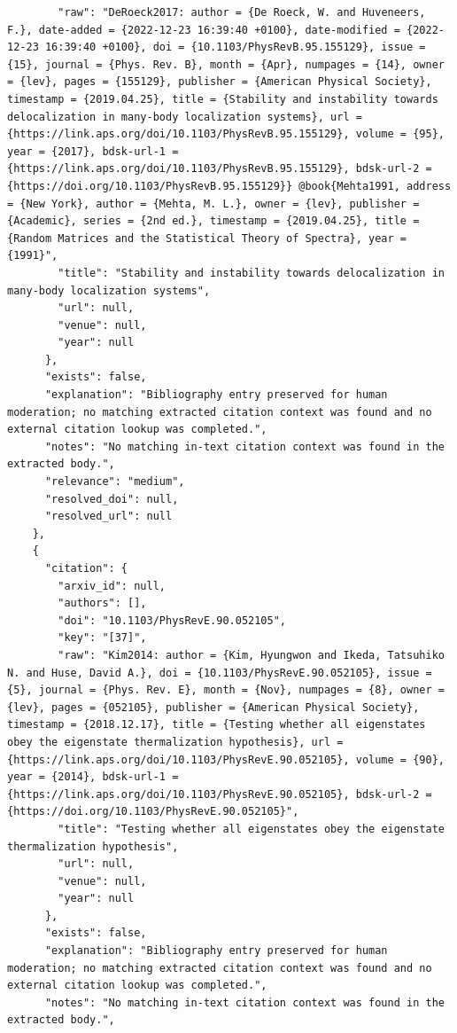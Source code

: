 \documentclass[11pt]{article}
\begin{document}
\begin{verbatim}
        "raw": "DeRoeck2017: author = {De Roeck, W. and Huveneers, F.}, date-added = {2022-12-23 16:39:40 +0100}, date-modified = {2022-12-23 16:39:40 +0100}, doi = {10.1103/PhysRevB.95.155129}, issue = {15}, journal = {Phys. Rev. B}, month = {Apr}, numpages = {14}, owner = {lev}, pages = {155129}, publisher = {American Physical Society}, timestamp = {2019.04.25}, title = {Stability and instability towards delocalization in many-body localization systems}, url = {https://link.aps.org/doi/10.1103/PhysRevB.95.155129}, volume = {95}, year = {2017}, bdsk-url-1 = {https://link.aps.org/doi/10.1103/PhysRevB.95.155129}, bdsk-url-2 = {https://doi.org/10.1103/PhysRevB.95.155129}} @book{Mehta1991, address = {New York}, author = {Mehta, M. L.}, owner = {lev}, publisher = {Academic}, series = {2nd ed.}, timestamp = {2019.04.25}, title = {Random Matrices and the Statistical Theory of Spectra}, year = {1991}",
        "title": "Stability and instability towards delocalization in many-body localization systems",
        "url": null,
        "venue": null,
        "year": null
      },
      "exists": false,
      "explanation": "Bibliography entry preserved for human moderation; no matching extracted citation context was found and no external citation lookup was completed.",
      "notes": "No matching in-text citation context was found in the extracted body.",
      "relevance": "medium",
      "resolved_doi": null,
      "resolved_url": null
    },
    {
      "citation": {
        "arxiv_id": null,
        "authors": [],
        "doi": "10.1103/PhysRevE.90.052105",
        "key": "[37]",
        "raw": "Kim2014: author = {Kim, Hyungwon and Ikeda, Tatsuhiko N. and Huse, David A.}, doi = {10.1103/PhysRevE.90.052105}, issue = {5}, journal = {Phys. Rev. E}, month = {Nov}, numpages = {8}, owner = {lev}, pages = {052105}, publisher = {American Physical Society}, timestamp = {2018.12.17}, title = {Testing whether all eigenstates obey the eigenstate thermalization hypothesis}, url = {https://link.aps.org/doi/10.1103/PhysRevE.90.052105}, volume = {90}, year = {2014}, bdsk-url-1 = {https://link.aps.org/doi/10.1103/PhysRevE.90.052105}, bdsk-url-2 = {https://doi.org/10.1103/PhysRevE.90.052105}",
        "title": "Testing whether all eigenstates obey the eigenstate thermalization hypothesis",
        "url": null,
        "venue": null,
        "year": null
      },
      "exists": false,
      "explanation": "Bibliography entry preserved for human moderation; no matching extracted citation context was found and no external citation lookup was completed.",
      "notes": "No matching in-text citation context was found in the extracted body.",

\end{verbatim}
\end{document}
